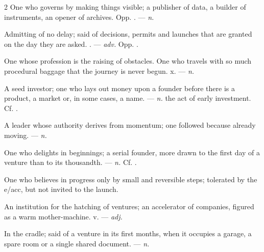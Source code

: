 \begin{multicols}{2}
 One who governs by making things visible; a publisher of data, a builder of instruments, an opener of archives. Opp. . —  \textit{n.}

 Admitting of no delay; said of decisions, permits and launches that are granted on the day they are asked. . —  \textit{adv.} Opp. .

  One whose profession is the raising of obstacles.  One who travels with so much procedural baggage that the journey is never begun.   x. —  \textit{n.}

 A seed investor; one who lays out money upon a founder before there is a product, a market or, in some cases, a name. —  \textit{n.} the act of early investment. Cf. .

 A leader whose authority derives from momentum; one followed because already moving. —  \textit{n.}

 One who delights in beginnings; a serial founder, more drawn to the first day of a venture than to its thousandth. —  \textit{n.} Cf. .

 One who believes in progress only by small and reversible steps; tolerated by the e/acc, but not invited to the launch.

 An institution for the hatching of ventures; an accelerator of companies, figured as a warm mother-machine.   v. —  \textit{adj.}

 In the cradle; said of a venture in its first months, when it occupies a garage, a spare room or a single shared document.   —  \textit{n.}


\end{multicols}
